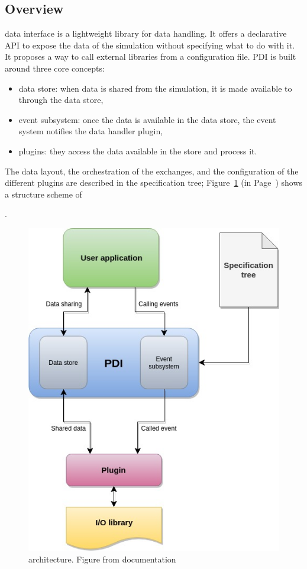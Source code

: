 \subsection{Overview}\label{sec:pdioverview}

\pdi\cite{roussel:hal-01587075} data interface is a lightweight library for data handling.
It offers a declarative API to expose the data of the simulation without specifying what to do with it.
It proposes a way to call external libraries from a configuration file. 
PDI is built around three core concepts: 
\begin{itemize}
    \item data store: when data is shared from the simulation, it is made available to \pdi through the data store,
    \item event subsystem: once the data is available in the data store, the event system notifies the data handler plugin,
    \item plugins: they access the data available in the store and process it.   
\end{itemize}
The data layout, the orchestration of the exchanges, and the configuration of the different plugins are described in the specification tree; Figure~\ref {figpdiarchi} (in Page~\pageref{figpdiarchi}) shows a structure scheme of 

\pdi\cite{noauthor_pdi_nodate}.  
\begin{figure}[h]\centering
\includegraphics[scale=0.45]{figures/PDI_schema.jpg}
\caption{\pdi architecture. Figure from \pdi documentation~\cite{PDI}}
\label{figpdiarchi}
\end{figure}



